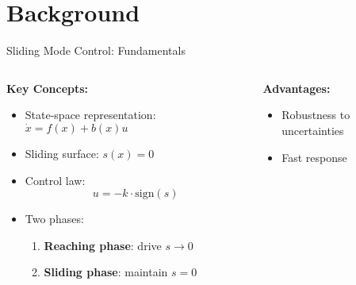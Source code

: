 \documentclass[10pt,aspectratio=169]{beamer}
\begin{document}
\section{Background}

\begin{frame}{Sliding Mode Control: Fundamentals}
\begin{columns}
\begin{column}{0.5\textwidth}
\textbf{Key Concepts:}
\begin{itemize}
    \item State-space representation: $\dot{x} = f(x) + b(x)u$
    \item Sliding surface: $s(x) = 0$
    \item Control law:
    \[
    u = -k \cdot \text{sign}(s)
    \]
    \item Two phases:
    \begin{enumerate}
        \item \textbf{Reaching phase}: drive $s \rightarrow 0$
        \item \textbf{Sliding phase}: maintain $s = 0$
    \end{enumerate}
\end{itemize}
\end{column}
\begin{column}{0.5\textwidth}
\begin{center}
\end{center}
\vspace{0.2cm}
\textbf{Advantages:}
\begin{itemize}
    \item Robustness to uncertainties
    \item Fast response
\end{itemize}
\end{column}
\end{columns}
\end{frame}
\end{document}
